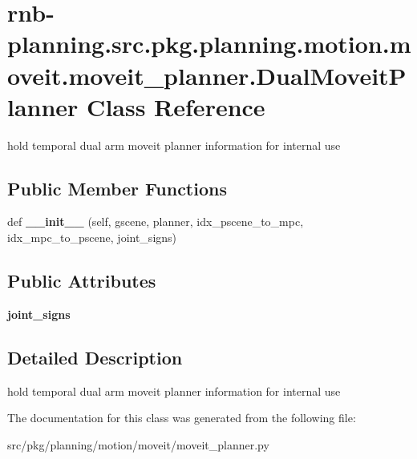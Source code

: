 \hypertarget{classrnb-planning_1_1src_1_1pkg_1_1planning_1_1motion_1_1moveit_1_1moveit__planner_1_1_dual_moveit_planner}{}\section{rnb-\/planning.src.\+pkg.\+planning.\+motion.\+moveit.\+moveit\+\_\+planner.\+Dual\+Moveit\+Planner Class Reference}
\label{classrnb-planning_1_1src_1_1pkg_1_1planning_1_1motion_1_1moveit_1_1moveit__planner_1_1_dual_moveit_planner}


hold temporal dual arm moveit planner information for internal use  


\subsection*{Public Member Functions}
\begin{DoxyCompactItemize}
\item 
\mbox{\label{classrnb-planning_1_1src_1_1pkg_1_1planning_1_1motion_1_1moveit_1_1moveit__planner_1_1_dual_moveit_planner_ad98745c04e1f72340892ea922e593e79}} 
def {\bfseries \+\_\+\+\_\+init\+\_\+\+\_\+} (self, gscene, planner, idx\+\_\+pscene\+\_\+to\+\_\+mpc, idx\+\_\+mpc\+\_\+to\+\_\+pscene, joint\+\_\+signs)
\end{DoxyCompactItemize}
\subsection*{Public Attributes}
\begin{DoxyCompactItemize}
\item 
\mbox{\label{classrnb-planning_1_1src_1_1pkg_1_1planning_1_1motion_1_1moveit_1_1moveit__planner_1_1_dual_moveit_planner_a0044a997e5ad0d408ea343e63c670f8f}} 
{\bfseries joint\+\_\+signs}
\end{DoxyCompactItemize}


\subsection{Detailed Description}
hold temporal dual arm moveit planner information for internal use 

The documentation for this class was generated from the following file\+:\begin{DoxyCompactItemize}
\item 
src/pkg/planning/motion/moveit/moveit\+\_\+planner.\+py\end{DoxyCompactItemize}

